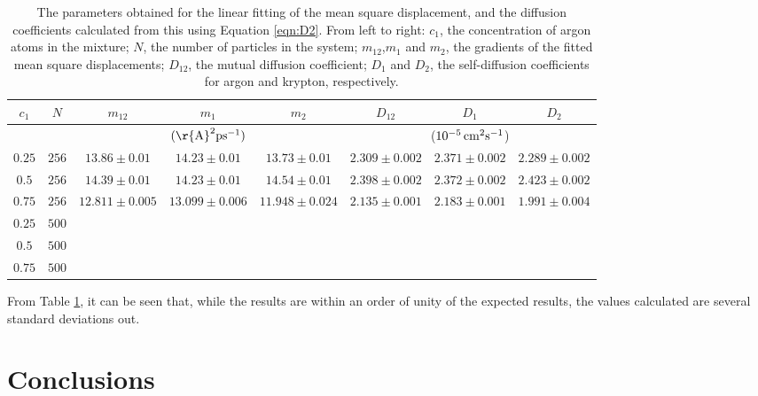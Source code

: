 \documentclass{article}
\begin{document}
\begin{table}[h!t]
\centering
\caption{ The parameters obtained for the linear fitting of the mean square displacement, and the diffusion coefficients calculated from this using Equation \ref{eqn:D2}. From left to right: $c_1$, the concentration of argon atoms in the mixture; $N$, the number of particles in the system; $m_{12}$,$m_{1}$ and $m_{2}$, the gradients of the fitted mean square displacements; $D_{12}$, the mutual diffusion coefficient; $D_{1}$ and $D_{2}$, the self-diffusion coefficients for argon and krypton, respectively. \label{table:results} }
%
\begin{tabular}{|c|c|c|c|c|c|c|c|} 
\hline
$c_1$ & $N$  & $m_{12}$ & $m_1$ & $m_2$ & $D_{12}$ & $D_{1}$ & $D_{2}$\\\hline
\multicolumn{2}{|c|}{} & \multicolumn{3}{|c|}{$(\rm{\r{A}}^2ps^{-1})$}& \multicolumn{3}{|c|}{($10^{-5}\,\rm{cm}^2\rm{s}^{-1}$)}\\\hline
$0.25$ & $256$  & $13.86\pm0.01$ & $14.23\pm0.01$ & $13.73\pm0.01$ & $2.309\pm0.002$ & $2.371\pm0.002$ & $2.289\pm0.002$ \\
$0.5$ & $256$ & $14.39\pm0.01$ & $14.23\pm0.01$ & $14.54\pm0.01$ & $2.398\pm0.002$ & $2.372\pm0.002$ & $2.423\pm0.002$\\
$0.75$ & $256$ & $12.811\pm0.005$ & $13.099\pm0.006$ & $11.948\pm0.024$ & $2.135\pm0.001$ & $2.183\pm0.001$ & $1.991\pm0.004$\\
$0.25$ & $500$	 \\
$0.5$ & $500$ \\
$0.75$ & $500$ \\
\end{tabular}
\end{table} 

From Table \ref{table:results}, it can be seen that, while the results are within an order of unity of the expected results, the values calculated are several standard deviations out. 

\section{Conclusions}





\end{document}

